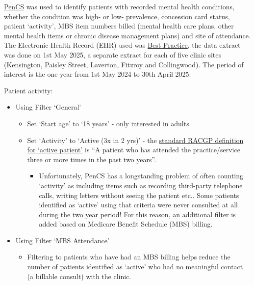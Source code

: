 \documentclass[
  letterpaper,
  DIV=11,
  numbers=noendperiod,
  oneside]{scrartcl}
\providecommand{\tightlist}{%
  \setlength{\itemsep}{0pt}\setlength{\parskip}{0pt}}\usepackage{longtable,booktabs,array}
\begin{document}
\href{https://www.pencs.com.au/}{PenCS} was used to identify patients
with recorded mental health conditions, whether the condition was high-
or low- prevalence, concession card status, patient `activity', MBS item
numbers billed (mental health care plans, other mental health items or
chronic disease management plans) and site of attendance. The Electronic
Health Record (EHR) used was
\href{https://bestpracticesoftware.com/}{Best Practice}, the data
extract was done on 1st May 2025, a separate extract for each of five
clinic sites (Kensington, Paisley Street, Laverton, Fitzroy and
Collingwood). The period of interest is the one year from 1st May 2024
to 30th April 2025.

Patient activity:

\begin{itemize}
\tightlist
\item
  Using Filter `General'

  \begin{itemize}
  \tightlist
  \item
    Set `Start age' to `18 years' - only interested in adults
  \item
    Set `Activity' to `Active (3x in 2 yrs)' - the
    \href{https://www.racgp.org.au/running-a-practice/practice-standards/standards-5th-edition/standards-for-general-practices-5th-ed/glossary}{standard
    RACGP definition for `active patient'} is ``A patient who has
    attended the practice/service three or more times in the past two
    years''.

    \begin{itemize}
    \tightlist
    \item
      Unfortunately, PenCS has a longstanding problem of often counting
      `activity' as including items such as recording third-party
      telephone calls, writing letters without seeing the patient etc..
      Some patients identified as `active' using that criteria were
      never consulted at all during the two year period! For this
      reason, an additional filter is added based on Medicare Benefit
      Schedule (MBS) billing.
    \end{itemize}
  \end{itemize}
\item
  Using Filter `MBS Attendance'

  \begin{itemize}
  \tightlist
  \item
    Filtering to patients who have had an MBS billing helps reduce the
    number of patients identified as `active' who had no meaningful
    contact (a billable consult) with the clinic.


\end{itemize}
\end{itemize}
\end{document}
